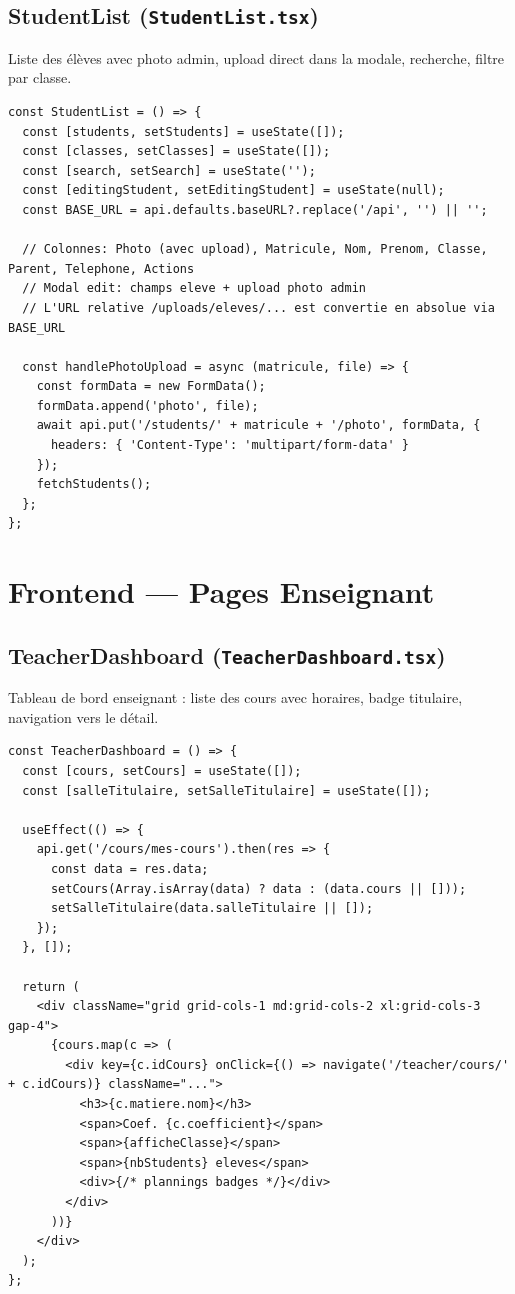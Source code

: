 \documentclass[12pt,a4paper]{article}
\begin{document}
\subsection{StudentList (\texttt{StudentList.tsx})}

Liste des élèves avec photo admin, upload direct dans la modale, recherche, filtre par classe.

\begin{lstlisting}[style=code]
const StudentList = () => {
  const [students, setStudents] = useState([]);
  const [classes, setClasses] = useState([]);
  const [search, setSearch] = useState('');
  const [editingStudent, setEditingStudent] = useState(null);
  const BASE_URL = api.defaults.baseURL?.replace('/api', '') || '';

  // Colonnes: Photo (avec upload), Matricule, Nom, Prenom, Classe, Parent, Telephone, Actions
  // Modal edit: champs eleve + upload photo admin
  // L'URL relative /uploads/eleves/... est convertie en absolue via BASE_URL

  const handlePhotoUpload = async (matricule, file) => {
    const formData = new FormData();
    formData.append('photo', file);
    await api.put('/students/' + matricule + '/photo', formData, {
      headers: { 'Content-Type': 'multipart/form-data' }
    });
    fetchStudents();
  };
};
\end{lstlisting}

\newpage

\section{Frontend --- Pages Enseignant}

\subsection{TeacherDashboard (\texttt{TeacherDashboard.tsx})}

Tableau de bord enseignant : liste des cours avec horaires, badge titulaire, navigation vers le détail.

\begin{lstlisting}[style=code]
const TeacherDashboard = () => {
  const [cours, setCours] = useState([]);
  const [salleTitulaire, setSalleTitulaire] = useState([]);

  useEffect(() => {
    api.get('/cours/mes-cours').then(res => {
      const data = res.data;
      setCours(Array.isArray(data) ? data : (data.cours || []));
      setSalleTitulaire(data.salleTitulaire || []);
    });
  }, []);

  return (
    <div className="grid grid-cols-1 md:grid-cols-2 xl:grid-cols-3 gap-4">
      {cours.map(c => (
        <div key={c.idCours} onClick={() => navigate('/teacher/cours/' + c.idCours)} className="...">
          <h3>{c.matiere.nom}</h3>
          <span>Coef. {c.coefficient}</span>
          <span>{afficheClasse}</span>
          <span>{nbStudents} eleves</span>
          <div>{/* plannings badges */}</div>
        </div>
      ))}
    </div>
  );
};
\end{lstlisting}
\end{document}
